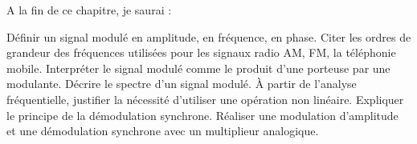 A la fin de ce chapitre, je saurai :
\begin{competences}
  \point Définir un signal modulé en amplitude, en fréquence, en phase.
  \point Citer les ordres de grandeur des fréquences utilisées pour les signaux radio AM, FM, la téléphonie mobile.
  \point Interpréter le signal modulé comme le produit d’une porteuse par une modulante.
  \point Décrire le spectre d’un signal modulé.
  \point À partir de l’analyse fréquentielle, justifier la nécessité d’utiliser une opération non linéaire.
  \point Expliquer le principe de la démodulation synchrone.
  \point \faSignLanguage Réaliser une modulation d’amplitude et une démodulation synchrone avec un multiplieur analogique.
\end{competences}
